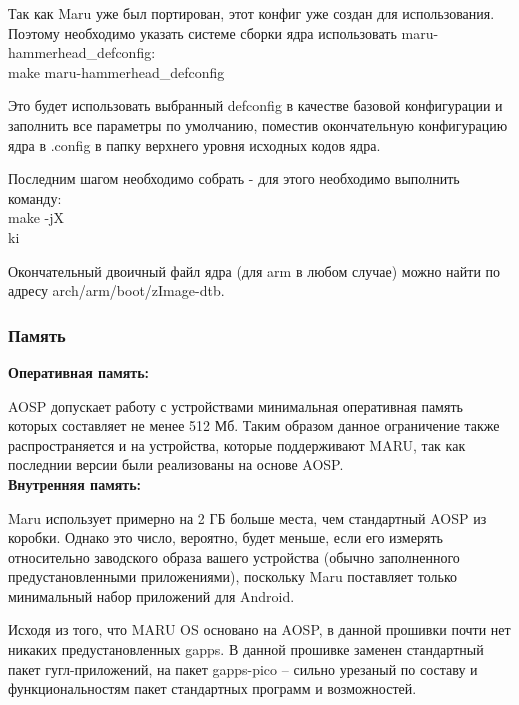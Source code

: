 \documentclass[a4paper, 14pt]{article}
\begin{document}
\par Так как Maru уже был портирован, этот конфиг уже создан для использования. Поэтому необходимо указать системе сборки ядра использовать maru-hammerhead\_defconfig: \\

make maru-hammerhead\_defconfig \\

\par Это будет использовать выбранный defconfig в качестве базовой конфигурации и заполнить все параметры по умолчанию, поместив окончательную конфигурацию ядра в .config в папку верхнего уровня исходных кодов ядра.

\par Последним шагом необходимо собрать - для этого необходимо выполнить команду: \\

make -jX \\ki

\par Окончательный двоичный файл ядра (для arm в любом случае) можно найти по адресу arch/arm/boot/zImage-dtb.



\subsubsection{Память}

\textbf{Оперативная память:} \\

\par AOSP допускает работу с устройствами минимальная оперативная память которых составляет не менее 512 Мб. Таким образом данное ограничение также распространяется и на устройства, которые поддерживают MARU, так как последнии версии были реализованы на основе AOSP.   \\

\textbf{Внутренняя память:} \\

\par Maru использует примерно на 2 ГБ больше места, чем стандартный AOSP из коробки. Однако это число, вероятно, будет меньше, если его измерять относительно заводского образа вашего устройства (обычно заполненного предустановленными приложениями), поскольку Maru поставляет только минимальный набор приложений для Android.

\par Исходя из того, что MARU OS основано на AOSP, в данной прошивки почти нет никаких предустановленных gapps. В данной прошивке заменен стандартный пакет гугл-приложений, на пакет gapps-pico -- сильно урезаный по составу и функциональностям пакет стандартных программ и возможностей. \\
\end{document}
